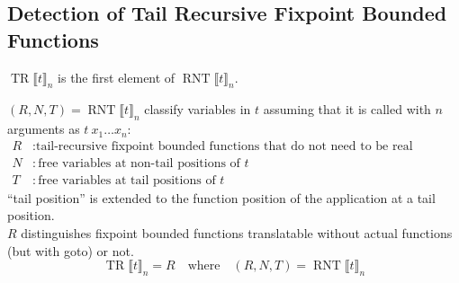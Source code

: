 \documentclass[a4paper,fleqn]{article}
\newcommand{\BRA}[1]{\llbracket #1 \rrbracket}
\DeclareMathOperator{\TRop}{TR}
\newcommand{\TR}[2]{\TRop\BRA{#1}_{#2}}
\DeclareMathOperator{\RNTop}{RNT}
\newcommand{\RNT}[2]{\RNTop\BRA{#1}_{#2}}
\newcommand{\kwgoto}{\mbox{\color{myviolet}\ttfamily goto}}
\begin{document}
\subsection{Detection of Tail Recursive Fixpoint Bounded Functions}\label{sec:tailrec-fixpoint-detection}
\raggedright
$\TR{t}{n}$ is the first element of $\RNT{t}{n}$.

$(R,N,T) = \RNT{t}{n}$ classify variables in $t$ assuming that it is called with $n$ arguments as $t~x_1\dots x_n$:
\begin{align*}
  R &: \text{tail-recursive fixpoint bounded functions that do not need to be real functions} \\
  N &: \text{free variables at non-tail positions of $t$} \\
  T &: \text{free variables at tail positions of $t$}
\end{align*}
``tail position'' is extended to the function position of the application at a tail position. \\
$R$ distinguishes fixpoint bounded functions translatable without actual functions (but with \kwgoto{}) or not.
\[ \TR{t}{n} = R \quad \text{where}\quad (R,N,T) = \RNT{t}{n} \]
\end{document}
